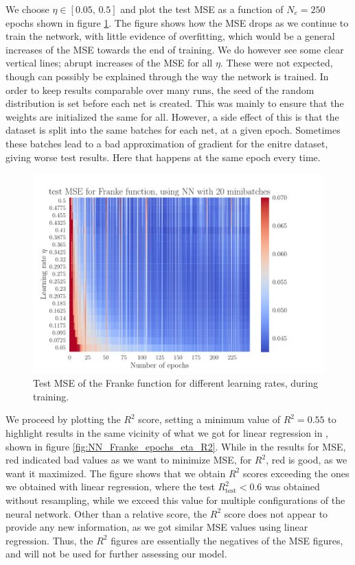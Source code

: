 \documentclass[12pt]{extarticle}
\begin{document}
We choose $\eta\in[0.05,\,0.5]$ and plot the test MSE as a function of $N_e=250$ epochs shown in figure \ref{fig:NN_Franke_epochs_eta_MSE_limited}. The figure shows how the MSE drops as we continue to train the network, with little evidence of overfitting, which would be a general increases of the MSE towards the end of training. We do however see some clear vertical lines; abrupt increases of the MSE for all $\eta$. These were not expected, though can possibly be explained through the way the network is trained. In order to keep results comparable over many runs, the seed of the random distribution is set before each net is created. This was mainly to ensure that the weights are initialized the same for all. However, a side effect of this is that the dataset is split into the same batches for each net, at a given epoch. Sometimes these batches lead to a bad approximation of gradient for the enitre dataset, giving worse test results. Here that happens at the same epoch every time.


\begin{figure}[h!]
	\includegraphics[width=\linewidth]{NN_Franke/NN_Franke__epochs_eta__test_MSE__582234.pdf}
	\caption{Test MSE of the Franke function for different learning rates, during training.}
	\label{fig:NN_Franke_epochs_eta_MSE_limited}
\end{figure}


We proceed by plotting the $R^2$ score, setting a minimum value of $R^2=0.55$ to highlight results in the same vicinity of what we got for linear regression in \cite{project1}, shown in figure \ref{fig:NN_Franke_epochs_eta_R2}. While in the results for MSE, red indicated bad values as we want to minimize MSE, for $R^2$, red is good, as we want it maximized. The figure shows that we obtain $R^2$ scores exceeding the ones we obtained with linear regression, where the test $R^2_\mathrm{test}<0.6$ was obtained without resampling, while we exceed this value for multiple configurations of the neural network. Other than a relative score, the $R^2$ score does not appear to provide any new information, as we got similar MSE values using linear regression. Thus, the $R^2$ figures are essentially the negatives of the MSE figures, and will not be used for further assessing our model.
\end{document}
